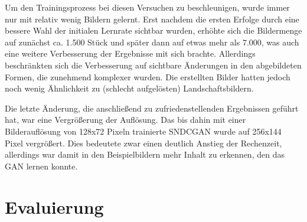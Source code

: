  Um den Trainingsprozess bei diesen Versuchen zu beschleunigen, wurde immer nur mit relativ wenig Bildern gelernt. Erst nachdem die ersten Erfolge durch eine bessere Wahl der initialen Lernrate sichtbar wurden, erhöhte sich die Bildermenge auf zunächst ca. 1.500 Stück und später dann auf etwas mehr als 7.000, was auch eine weitere Verbesserung der Ergebnisse mit sich brachte. Allerdings beschränkten sich die Verbesserung auf sichtbare Änderungen in den abgebildeten Formen, die zunehmend komplexer wurden. Die erstellten Bilder hatten jedoch noch wenig Ähnlichkeit zu (schlecht aufgelösten) Landschaftsbildern.
 
 Die letzte Änderung, die anschließend zu zufriedenstellenden Ergebnissen geführt hat, war eine Vergrößerung der Auflösung. Das bis dahin mit einer Bilderauflösung von 128x72 Pixeln trainierte SNDCGAN wurde auf 256x144 Pixel vergrößert. Dies bedeutete zwar einen deutlich Anstieg der Rechenzeit, allerdings war damit in den Beispielbildern mehr Inhalt zu erkennen, den das GAN lernen konnte.
 
 \section{Evaluierung} %